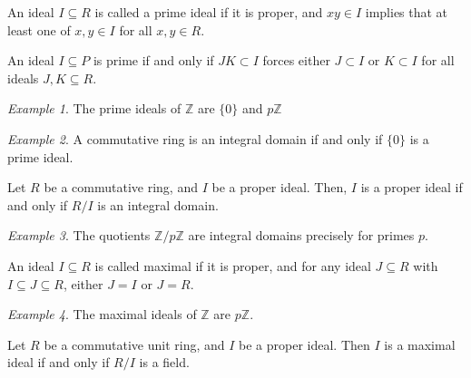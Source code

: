 \documentclass[11pt]{article}
\newcommand{\Z}{\mathbb{Z}}
\theoremstyle{definition}
\theoremstyle{remark}
\newtheorem*{example}{Example}
\numberwithin{equation}{section}
\begin{document}
    \begin{definition}
        An ideal $I \subseteq R$ is called a prime ideal if it is proper, and $xy \in
        I$ implies that at least one of $x, y \in I$ for all $x, y \in R$.
    \end{definition}

    \begin{lemma}
        An ideal $I \subseteq P$ is prime if and only if $JK \subset I$ forces either
        $J \subset I$ or $K \subset I$ for all ideals $J, K \subseteq R$.
    \end{lemma}

    \begin{example}
        The prime ideals of $\Z$ are $\{0\}$ and $p\Z$
    \end{example}
    \begin{example}
        A commutative ring is an integral domain if and only if $\{0\}$ is a prime
        ideal.
    \end{example}

    \begin{theorem}
        Let $R$ be a commutative ring, and $I$ be a proper ideal. Then, $I$ is a
        proper ideal if and only if $R/I$ is an integral domain.
    \end{theorem}
    \begin{example}
        The quotients $\Z/p\Z$ are integral domains precisely for primes $p$.
    \end{example}

    \begin{definition}
        An ideal $I \subseteq R$ is called maximal if it is proper, and for any ideal
        $J \subseteq R$ with $I \subseteq J \subseteq R$, either $J = I$ or $J = R$.
    \end{definition}
    \begin{example}
        The maximal ideals of $\Z$ are $p\Z$.
    \end{example}

    \begin{theorem}
        Let $R$ be a commutative unit ring, and $I$ be a proper ideal. Then $I$ is a
        maximal ideal if and only if $R/I$ is a field.
    \end{theorem}
\end{document}
